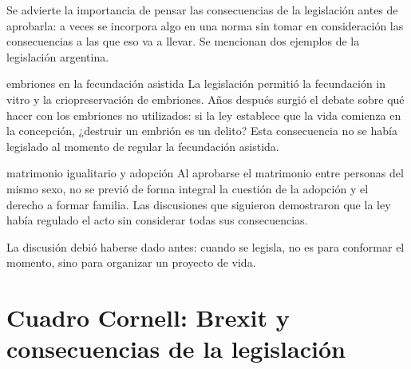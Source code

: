 \documentclass[12pt,oneside]{book}
\begin{document}
Se advierte la importancia de pensar las consecuencias de la legislación antes de aprobarla: a veces se incorpora algo en una norma sin tomar en consideración las consecuencias a las que eso va a llevar. Se mencionan dos ejemplos de la legislación argentina.

\begin{example}{embriones en la fecundación asistida}
La legislación permitió la fecundación in vitro y la criopreservación de embriones. Años después surgió el debate sobre qué hacer con los embriones no utilizados: si la ley establece que la vida comienza en la concepción, ¿destruir un embrión es un delito? Esta consecuencia no se había legislado al momento de regular la fecundación asistida.
\end{example}

\begin{example}{matrimonio igualitario y adopción}
Al aprobarse el matrimonio entre personas del mismo sexo, no se previó de forma integral la cuestión de la adopción y el derecho a formar familia. Las discusiones que siguieron demostraron que la ley había regulado el acto sin considerar todas sus consecuencias.
\end{example}

La discusión debió haberse dado antes: cuando se legisla, no es para conformar el momento, sino para organizar un proyecto de vida.

\section{Cuadro Cornell: Brexit y consecuencias de la legislación}
\end{document}
